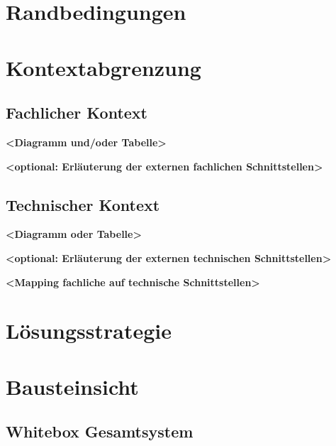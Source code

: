 \documentclass[
]{article}
\begin{document}
\hypertarget{section-architecture-constraints}{%
\section{Randbedingungen}\label{section-architecture-constraints}}

\hypertarget{section-system-scope-and-context}{%
\section{Kontextabgrenzung}\label{section-system-scope-and-context}}

\hypertarget{_fachlicher_kontext}{%
\subsection{Fachlicher Kontext}\label{_fachlicher_kontext}}

\textbf{\textless Diagramm und/oder Tabelle\textgreater{}}

\textbf{\textless optional: Erläuterung der externen fachlichen
Schnittstellen\textgreater{}}

\hypertarget{_technischer_kontext}{%
\subsection{Technischer Kontext}\label{_technischer_kontext}}

\textbf{\textless Diagramm oder Tabelle\textgreater{}}

\textbf{\textless optional: Erläuterung der externen technischen
Schnittstellen\textgreater{}}

\textbf{\textless Mapping fachliche auf technische
Schnittstellen\textgreater{}}

\hypertarget{section-solution-strategy}{%
\section{Lösungsstrategie}\label{section-solution-strategy}}

\hypertarget{section-building-block-view}{%
\section{Bausteinsicht}\label{section-building-block-view}}

\hypertarget{_whitebox_gesamtsystem}{%
\subsection{Whitebox Gesamtsystem}\label{_whitebox_gesamtsystem}}
\end{document}
